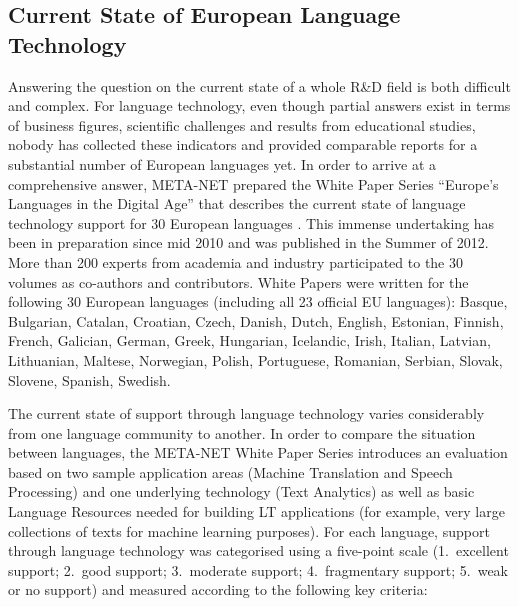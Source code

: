\documentclass[10pt, plain]{../../metanetpaper}
\begin{document}
\clearpage


\label{sec:lwp}

\begin{multicols}{2}

\subsection{Current State of European Language Technology}
\label{sec:what-current-state}

Answering the question on the current state of a whole R\&D field is both difficult and complex. For language technology, even though partial answers exist in terms of business figures, scientific challenges and results from educational studies, nobody has collected these indicators and provided comparable reports for a substantial number of European languages yet. In order to arrive at a comprehensive answer, META-NET prepared the White Paper Series ``Europe's Languages in the Digital Age'' that describes the current state of language technology support for 30 European languages \cite{LWP2012}. This immense undertaking has been in preparation since mid 2010 and was published in the Summer of 2012. More than 200 experts from academia and industry participated to the 30 volumes as co-authors and contributors. White Papers were written for the following 30 European languages (including all 23 official EU languages): Basque, Bulgarian, Catalan, Croatian, Czech, Danish, Dutch, English, Estonian, Finnish, French, Galician, German, Greek, Hungarian, Icelandic, Irish, Italian, Latvian, Lithuanian, Maltese, Norwegian, Polish, Portuguese, Romanian, Serbian, Slovak, Slovene, Spanish, Swedish.

The current state of support through language technology varies considerably from one language community to another. In order to compare the situation between languages, the META-NET White Paper Series introduces an evaluation based on two sample application areas (Machine Translation and Speech Processing) and one underlying technology (Text Analytics) as well as basic Language Resources needed for building LT applications (for example, very large collections of texts for machine learning purposes). For each language, support through language technology was categorised using a five-point scale (1.~excellent support; 2.~good support; 3.~moderate support; 4.~fragmentary support; 5.~weak or no support) and measured according to the following key criteria:


\end{multicols}
\end{document}
